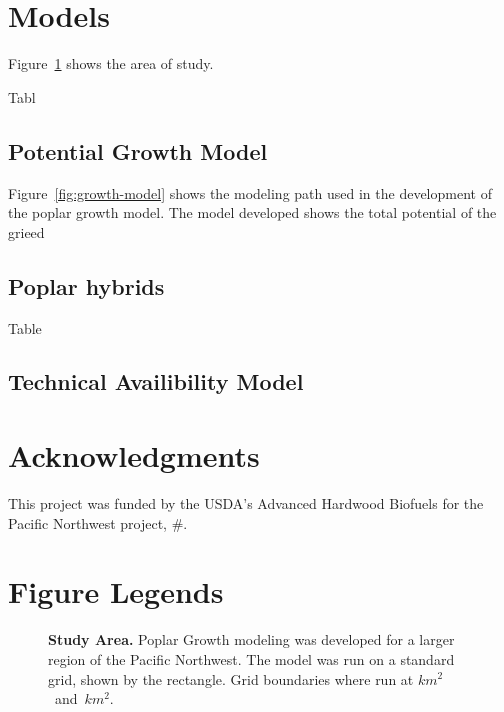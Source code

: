 \documentclass[10pt]{article}
\begin{document}
\section*{Models}

Figure~\ref{fig:study-area} shows the area of study.

Tabl

\subsection*{Potential Growth Model}

Figure~\ref{fig:growth-model} shows the modeling path used in the
development of the poplar growth model. The model developed shows the
total potential of the grieed

\subsection*{Poplar hybrids}

Table 

\subsection*{Technical Availibility Model}


\section*{Acknowledgments}
This project was funded by the USDA's Advanced Hardwood Biofuels for the Pacific Northwest project, #.



\section*{Figure Legends}
\begin{figure}[!ht]
\begin{center}
\vspace*{4cm}
\end{center}
\caption{ {\bf Study Area.}  Poplar Growth modeling was developed for
  a larger region of the Pacific Northwest.  The model was run on a
  standard grid, shown by the rectangle. Grid boundaries where run at
  \unit[2]{$km^2$} and \unit[8]{$km^2$}.  }
\label{fig:study-area}
\end{figure}
\end{document}
